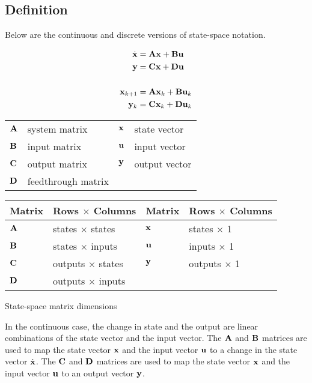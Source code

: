 \subsection{Definition}

Below are the continuous and discrete versions of state-space notation.

\begin{definition}%

  \begin{align}
    \dot{\mathbf{x}} &= \mathbf{A}\mathbf{x} + \mathbf{B}\mathbf{u} \label{eq:ss_ctrl_x} \\
    \mathbf{y} &= \mathbf{C}\mathbf{x} + \mathbf{D}\mathbf{u} \label{eq:ss_ctrl_y} \\
    \nonumber \\
    \mathbf{x}_{k+1} &= \mathbf{A}\mathbf{x}_k + \mathbf{B}\mathbf{u}_k \label{eq:ssz_ctrl_x} \\
    \mathbf{y}_k &= \mathbf{C}\mathbf{x}_k + \mathbf{D}\mathbf{u}_k \label{eq:ssz_ctrl_y}
  \end{align}

  \begin{figurekey}
    \begin{tabular}{llll}
      $\mathbf{A}$ & system matrix      & $\mathbf{x}$ & state vector \\
      $\mathbf{B}$ & input matrix       & $\mathbf{u}$ & input vector \\
      $\mathbf{C}$ & output matrix      & $\mathbf{y}$ & output vector \\
      $\mathbf{D}$ & feedthrough matrix &  &  \\
    \end{tabular}
  \end{figurekey}
\end{definition}

\begin{booktable}
  \begin{tabular}{|ll|ll|}
    \hline
    \rowcolor{headingbg}
    \textbf{Matrix} & \textbf{Rows $\times$ Columns} &
    \textbf{Matrix} & \textbf{Rows $\times$ Columns} \\
    \hline
    $\mathbf{A}$ & states $\times$ states & $\mathbf{x}$ & states $\times$ 1 \\
    $\mathbf{B}$ & states $\times$ inputs & $\mathbf{u}$ & inputs $\times$ 1 \\
    $\mathbf{C}$ & outputs $\times$ states & $\mathbf{y}$ & outputs $\times$ 1 \\
    $\mathbf{D}$ & outputs $\times$ inputs &  &  \\
    \hline
  \end{tabular}
  \caption{State-space matrix dimensions}
\end{booktable}

In the continuous case, the change in \gls{state} and the \gls{output} are
linear combinations of the \gls{state} vector and the \gls{input} vector. The
$\mathbf{A}$ and $\mathbf{B}$ matrices are used to map the \gls{state} vector
$\mathbf{x}$ and the \gls{input} vector $\mathbf{u}$ to a change in the \gls{state}
vector $\dot{\mathbf{x}}$. The $\mathbf{C}$ and $\mathbf{D}$ matrices are used to map the
\gls{state} vector $\mathbf{x}$ and the \gls{input} vector $\mathbf{u}$ to an
\gls{output} vector $\mathbf{y}$.
